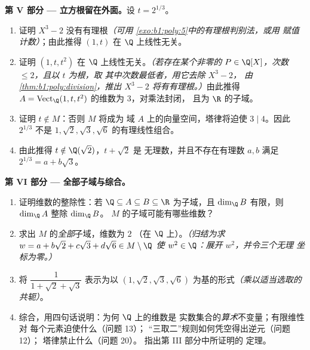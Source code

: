 \begin{problem}
\medskip
\noindent\textbf{第 V 部分 --- 立方根留在外面。}设 $t
= 2^{1/3}$。
\begin{enumerate}[resume]
  \item 证明 $X^3 - 2$ 没有有理根\emph{（可用
        \cref{exo:b1:poly:5}中的有理根判别法，或用
        赋值计数）}；由此推得 $(1, t)$ 在
        $\Q$ 上线性无关。
  \item 证明 $(1, t, t^2)$ 在 $\Q$ 上线性无关。\emph{（若存在某个非零的
        $P \in \Q[X]$，次数 $\leq 2$，且以 $t$ 为根，取
        其中次数最低者，用它去除 $X^3 - 2$，
        由\cref{thm:b1:poly:division}，推出 $X^3 - 2$
        将有有理根。）}由此推得 $A =
        \operatorname{Vect}_\Q(1, t, t^2)$ 的维数为 $3$，对乘法封闭，
        且为 $\R$ 的子域。
  \item 证明 $t \notin M$：否则 $M$ 将成为
        域 $A$ 上的向量空间，塔律将迫使
        $3 \mid 4$。因此 $2^{1/3}$ 不是
        $1, \sqrt2, \sqrt3, \sqrt6$ 的有理线性组合。
  \item 由此推得 $t \notin \Q(\sqrt2)$，$t + \sqrt2$ 是
        无理数，并且不存在有理数 $a, b$ 满足
        $2^{1/3} = a + b\sqrt3$。
\end{enumerate}

\medskip
\noindent\textbf{第 VI 部分 --- 全部子域与综合。}
\begin{enumerate}[resume]
  \item 证明维数的整除性：若 $\Q \subseteq A
        \subseteq B \subseteq \R$ 为子域，且 $\dim_\Q B$
        有限，则 $\dim_\Q A$ 整除 $\dim_\Q B$。
        $M$ 的子域可能有哪些维数？
  \item 求出 $M$ 的\emph{全部}子域，维数为 $2$
        （在 $\Q$ 上）。\emph{（归结为求 $w = a + b\sqrt2
        + c\sqrt3 + d\sqrt6 \in M \setminus \Q$ 使 $w^2 \in
        \Q$：展开 $w^2$，并令三个无理
        坐标为零。）}
  \item 将 $\dfrac1{1 + \sqrt2 + \sqrt3}$ 表示为以 $(1,
        \sqrt2, \sqrt3, \sqrt6)$ 为基的形式\emph{（乘以适当选取的
        共轭）}。
  \item 综合，用四句话说明：为何 $\Q$ 上的维数是
        实数集合的\emph{算术}不变量；有限维性对
        每个元素迫使什么（问题 13）；
        “三取二”规则如何凭空得出逆元（问题 12）；
        塔律禁止什么（问题 20）。
        指出第 III 部分中所证明的
        定理。
\end{enumerate}
\end{problem}
